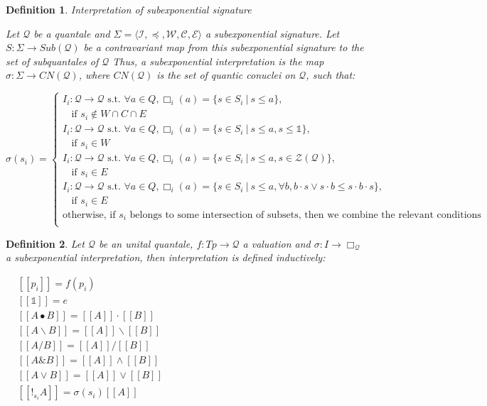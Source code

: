 \documentclass[a4paper]{article}
\theoremstyle{defin}
\newtheorem{defin}{Definition}
\theoremstyle{theorem}
\theoremstyle{prop}
\theoremstyle{lemma}
\theoremstyle{ex}
\theoremstyle{col}
\begin{document}
\begin{defin} Interpretation of subexponential signature

Let $\mathcal{Q}$ be a quantale and $\Sigma = \langle \mathcal{I}, \preceq, \mathcal{W}, \mathcal{C}, \mathcal{E} \rangle$
a subexponential signature. Let $S : \Sigma \to Sub(\mathcal{Q})$ be a contravariant map from this subexponential
signature to the set of subquantales of $\mathcal{Q}$ Thus, a subexponential interpretation is the map
$\sigma : \Sigma \to CN(\mathcal{Q})$, where $CN(\mathcal{Q})$ is the set of quantic conuclei on $\mathcal{Q}$, such that:

  $\sigma(s_i) = \begin{cases}
  I_i : \mathcal{Q} \to \mathcal{Q} \text{ s.t. } \forall a \in Q, \Box_i(a) = \{ s \in S_i \: | \: s \leq a\},
  \\ \:\:\:\: \text{if $s_i \notin W \cap C \cap E$} \\
  I_i : \mathcal{Q} \to \mathcal{Q} \text{ s.t. } \forall a \in Q, \Box_i(a) = \{ s \in S_i \: | \: s \leq a, s \leq \mathds{1}\},
  \\ \:\:\:\: \text{if $s_i \in W$} \\
  I_i : \mathcal{Q} \to \mathcal{Q} \text{ s.t. } \forall a \in Q, \Box_i(a) = \{ s \in S_i \: | \: s \leq a, s \in \mathcal{Z}(\mathcal{Q}) \},
  \\ \:\:\:\: \text{if $s_i \in E$} \\
  I_i : \mathcal{Q} \to \mathcal{Q} \text{ s.t. } \forall a \in Q, \Box_i(a) = \{ s \in S_i \: | \: s \leq a, \forall b, b \cdot s \vee s \cdot b \leq s \cdot b \cdot s \},
  \\ \:\:\:\: \text{if $s_i \in E$} \\
  \text{otherwise, if $s_i$ belongs to some intersection of subsets, then we combine the relevant conditions } \\
  \end{cases}$
\end{defin}

\begin{defin} Let $\mathcal{Q}$ be an unital quantale, $f : Tp \to \mathcal{Q}$ a valuation and $\sigma : I \to \Box_{\mathcal{Q}}$ a subexponential interpretation, then
  interpretation is defined inductively:

\begin{center}
$\begin{array}{lll}
& [\![p_i]\!] = f(p_i)&\\
& [\![\mathds{1}]\!] = e & \\
&[\![A \bullet B]\!] = [\![A]\!] \cdot [\![B]\!] & \\
&[\![A \backslash B]\!] = [\![A]\!] \backslash [\![B]\!] & \\
&[\![A / B]\!] = [\![A]\!] / [\![B]\!]& \\
&[\![A \& B]\!] = [\![A]\!] \wedge [\![B]\!]& \\
&[\![A \vee B]\!] = [\![A]\!] \vee [\![B]\!]& \\
&[\![!_{s_i} A]\!] = \sigma(s_i) [\![A]\!]&
\end{array}$
\end{center}
\end{defin}
\end{document}
